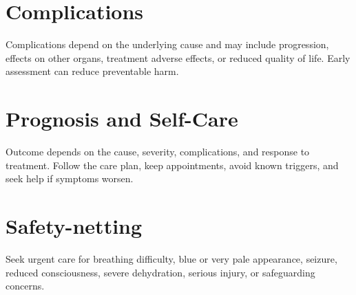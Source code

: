\section*{Complications}
Complications depend on the underlying cause and may include progression, effects on other organs, treatment adverse effects, or reduced quality of life. Early assessment can reduce preventable harm.

\section*{Prognosis and Self-Care}
Outcome depends on the cause, severity, complications, and response to treatment. Follow the care plan, keep appointments, avoid known triggers, and seek help if symptoms worsen.
\section*{Safety-netting}
Seek urgent care for breathing difficulty, blue or very pale appearance, seizure, reduced consciousness, severe dehydration, serious injury, or safeguarding concerns.
